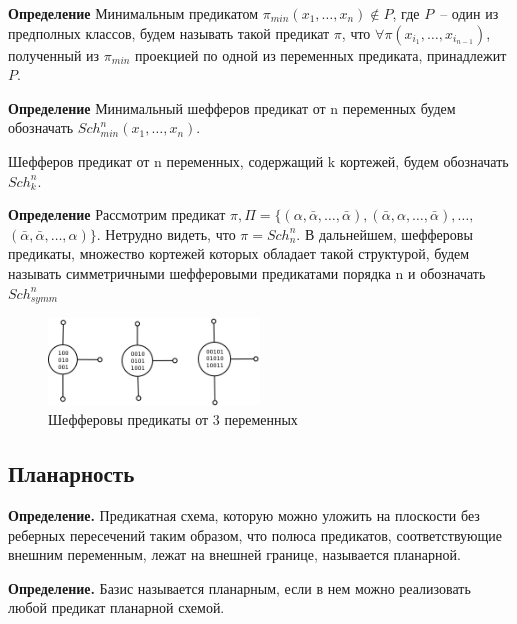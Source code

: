 \documentclass[12pt]{article}
\begin{document}
\textbf{Определение} Минимальным предикатом $\pi_{min}(x_1, \dots, x_n) \notin P$, где $P$~-- один из предполных классов, будем называть такой 
предикат $\pi$, что $\forall \pi(x_{i_1}, \dots, x_{i_{n-1}})$, полученный из $\pi_{min}$ проекцией по одной из переменных
предиката, принадлежит $P$.

\textbf{Определение} Минимальный шефферов предикат от n переменных будем обозначать $Sch_{min}^n(x_1, \dots, x_n)$.

Шефферов предикат от n переменных, содержащий k кортежей, будем обозначать $Sch_k^n$.

\textbf{Определение}
Рассмотрим предикат 
$\pi, \Pi = \{ (\alpha, \bar{\alpha}, \dots, \bar{\alpha}), (\bar{\alpha}, \alpha, \dots, \bar{\alpha}), \dots, $
$(\bar{\alpha}, \bar{\alpha}, \dots, \alpha) \}$. Нетрудно видеть, что $\pi = Sch_n^n$. В дальнейшем,
шефферовы предикаты, множество кортежей которых обладает такой структурой, будем называть 
симметричными шефферовыми предикатами порядка n и обозначать $Sch_{symm}^n$

\begin{figure}[htb]
\centering
\includegraphics[width=0.5\textwidth]{scheff3.png}
\caption{Шефферовы предикаты от 3 переменных}
\label{fig:sheff}
\end{figure}


\subsection{Планарность}

\textbf{Определение.} 
Предикатная схема, которую можно уложить на плоскости без реберных пересечений таким образом, что полюса предикатов, 
соответствующие внешним переменным, лежат на внешней границе, называется планарной. 

\textbf{Определение.} Базис называется планарным, если в нем можно реализовать любой предикат планарной схемой.
\end{document}
